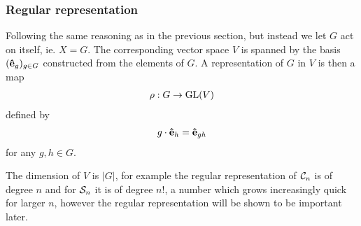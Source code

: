 \subsubsection{Regular representation}

	Following the same reasoning as in the previous section, but instead we let $G$ act on itself, ie. $X = G$. The corresponding vector space $V$ is spanned by the basis $(\mathbf{\hat{e}}_g)_{g \in G}$ constructed from the elements of $G$. A representation of $G$ in $V$ is then a map
	\begin{align*}
		\rho: G \rightarrow \text{GL}(V)
	\end{align*}
	defined by
	\begin{align*}
		g \cdot \mathbf{\hat{e}}_h = \mathbf{\hat{e}}_{gh}
	\end{align*}
	for any $g,h \in G$.%
	
	The dimension of $V$ is $|G|$, for example the regular representation of $\mathcal{C}_n$ is of degree $n$ and for $\mathcal{S}_n$ it is of degree $n!$, a number which grows increasingly quick for larger $n$, however the regular representation will be shown to be important later.
	
